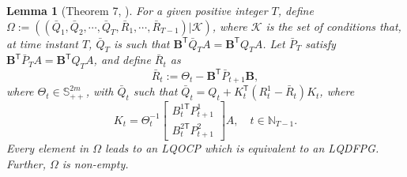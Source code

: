 \documentclass[letterpaper, 10 pt, conference]{ieeeconf}  %
\newcommand{\transpose}{\mathsf{T}}
\newtheorem{lemma}{Lemma}
\begin{document}
\begin{lemma}[Theorem 7, \cite{prasad_structure_2023}]
    For a given positive integer $T$, define
        $\Omega := ((\bar{Q}_{1},\bar{Q}_{2},\cdots,\bar{Q}_{T},\bar{R}_{1},\cdots,\bar{R}_{T-1})|\mathcal{K})$,
    where $\mathcal{K}$ is the set of conditions that, at time instant $T$, $\bar{Q}_{T}$ is such that
            $\mathbf{B}^{\transpose}\bar{Q}_{T}A = \mathbf{B}^{\transpose}Q_{T}A$.
        Let $\bar{P}_{T}$ satisfy
            $\mathbf{B}^{\transpose}\bar{P}_{T}A = \mathbf{B}^{\transpose}Q_{T}A$, and define $\bar{R}_{t}$ as
            \begin{equation}\label{eq:matrixR}
            \bar{R}_{t} := \Theta_{t} - \mathbf{B}^{\transpose}\bar{P}_{t+1}\mathbf{B},
            \end{equation}
        where $\Theta_{t} \in \mathbb{S}_{++}^{2m}$,
        with $\bar{Q}_{t}$ such that
            $\bar{Q}_{t} = Q_{t} + K_{t}^{\transpose}(R_{t}^{1}-\bar{R}_{t})K_{t}$,
        where
        \begin{equation*}
            K_{t} = \Theta_{t}^{-1}
            \begin{bmatrix}
                B_{t}^{1\transpose}P_{t+1}^{1}\\
                B_{t}^{2\transpose}P_{t+1}^{2}
            \end{bmatrix}
            A,\quad t\in \mathbb{N}_{T-1}.
        \end{equation*}
    Every element in $\Omega$ leads to an LQOCP which is equivalent to an LQDFPG. Further, $\Omega$ is non-empty.
\end{lemma}
\end{document}
